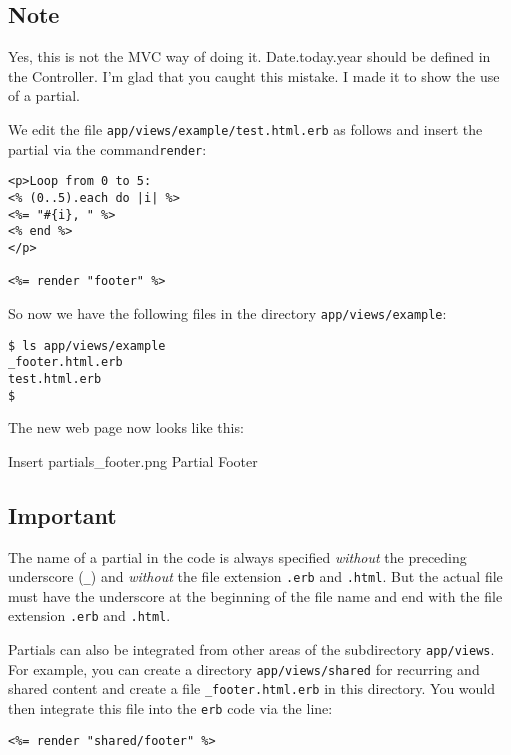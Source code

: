 \documentclass[a4paper]{book}
\begin{document}
\subsection{Note}\label{note-16}

Yes, this is not the MVC way of doing it. Date.today.year should be defined in the Controller. I'm glad that you caught this mistake. I made it to show the use of a partial.

We edit the file \texttt{app/views/example/test.html.erb} as follows and insert the partial via the command\texttt{render}:

\begin{shaded}\begin{verbatim}
<p>Loop from 0 to 5:
<% (0..5).each do |i| %>
<%= "#{i}, " %>
<% end %>
</p>

<%= render "footer" %>
\end{verbatim}\end{shaded}

So now we have the following files in the directory \texttt{app/views/example}:

\begin{shaded}\begin{verbatim}
$ ls app/views/example
_footer.html.erb
test.html.erb
$
\end{verbatim}\end{shaded}

The new web page now looks like this:

Insert partials\_footer.png Partial Footer

\subsection{Important}\label{important-7}

The name of a partial in the code is always specified \emph{without} the preceding underscore (\texttt{\_}) and \emph{without} the file extension \texttt{.erb} and \texttt{.html}. But the actual file must have the underscore at the beginning of the file name and end with the file extension \texttt{.erb} and \texttt{.html}.

Partials can also be integrated from other areas of the subdirectory \texttt{app/views}. For example, you can create a directory \texttt{app/views/shared} for recurring and shared content and create a file \texttt{\_footer.html.erb} in this directory. You would then integrate this file into the \texttt{erb} code via the line:

\begin{shaded}\begin{verbatim}
<%= render "shared/footer" %>
\end{verbatim}\end{shaded}
\end{document}
